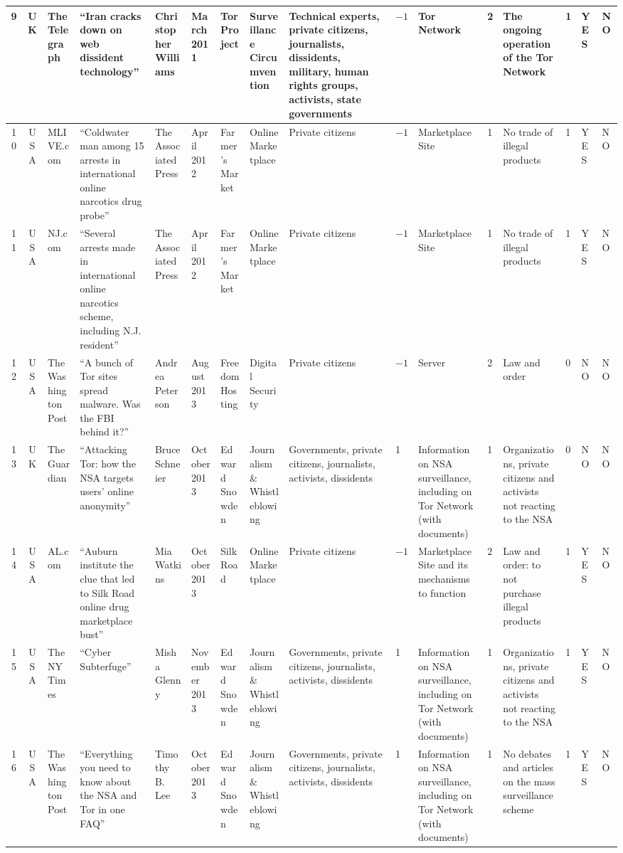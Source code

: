 \begin{landscape}
{\begin{longtable}{|c|c|p{1.2cm}|p{2.5cm}|p{1.4cm}|p{1.2cm}|p{1.4cm}|p{1.2cm}|p{1.8cm}|p{0.4cm}|p{1.8cm}|p{0.4cm}|p{1.5cm}|p{0.4cm}|p{0.6cm}|p{0.6cm}|}
\hline
9 & UK & The Telegraph & ``Iran cracks down on web dissident technology'' & Christopher Williams & March 2011 &Tor Project & Surveillance Circumvention & Technical experts, private citizens, journalists, dissidents, military, human rights groups, activists, state governments & $-1$ & Tor Network & 2 & The ongoing operation of the Tor Network & 1 & YES & NO \\
\hline
10 & USA & MLIVE.com & ``Coldwater man among 15 arrests in international online narcotics drug probe'' & The Associated Press & April 2012 &Farmer's Market & Online Marketplace & Private citizens & $-1$ & Marketplace Site & 1 & No trade of illegal products & 1 & YES & NO \\
\hline
11 & USA & NJ.com & ``Several arrests made in international online narcotics scheme, including N.J. resident'' & The Associated Press & April 2012 &Farmer's Market & Online Marketplace & Private citizens & $-1$ & Marketplace Site & 1 & No trade of illegal products & 1 & YES & NO \\
\hline
12 & USA & The Washington Post & ``A bunch of Tor sites spread malware. Was the FBI behind it?'' & Andrea Peterson & August 2013 &Freedom Hosting & Digital Security & Private citizens & $-1$ & Server & 2 & Law and order & 0 & NO & NO \\
\hline
13 & UK & The Guardian & ``Attacking Tor: how the NSA targets users' online anonymity'' & Bruce Schneier & October 2013 &Edward Snowden & Journalism \& Whistleblowing & Governments, private citizens, journalists, activists, dissidents & 1 & Information on NSA surveillance, including on Tor Network (with documents) & 1 & Organizations, private citizens and activists not reacting to the NSA & 0 & NO & NO \\
\hline
14 & USA & AL.com & ``Auburn institute the clue that led to Silk Road online drug marketplace bust'' & Mia Watkins & October 2013 &Silk Road & Online Marketplace & Private citizens & $-1$ & Marketplace Site and its mechanisms to function & 2 & Law and order: to not purchase illegal products & 1 & YES & NO \\
\hline
15 & USA & The NY Times & ``Cyber Subterfuge'' & Misha Glenny & November 2013 &Edward Snowden & Journalism \& Whistleblowing & Governments, private citizens, journalists, activists, dissidents & 1 & Information on NSA surveillance, including on Tor Network (with documents) & 1 & Organizations, private citizens and activists not reacting to the NSA & 1 & YES & NO \\
\hline
16 & USA & The Washington Post & ``Everything you need to know about the NSA and Tor in one FAQ'' & Timothy B. Lee & October 2013 &Edward Snowden & Journalism \& Whistleblowing & Governments, private citizens, journalists, activists, dissidents & 1 & Information on NSA surveillance, including on Tor Network (with documents) & 1 & No debates and articles on the mass surveillance scheme & 1 & YES & NO \\

\end{longtable}}
\end{landscape}
